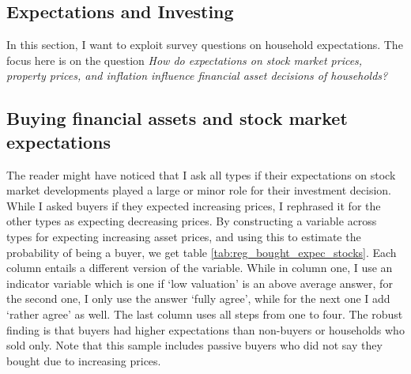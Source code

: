 \documentclass[ProjectABM]{subfiles}
\begin{document}
\subsection{Expectations and Investing} \label{sec:results_exp}
In this section, I want to exploit survey questions on household expectations. The focus here is on the question \textit{How do expectations on stock market prices, property prices, and inflation influence financial asset decisions of households?} 

\subsection{Buying financial assets and stock market expectations}
The reader might have noticed that I ask all types if their expectations on stock market developments played a large or minor role for their investment decision. While I asked buyers if they expected increasing prices, I rephrased it for the other types as expecting decreasing prices. By constructing a variable across types for expecting increasing asset prices, and using this to estimate the probability of being a buyer, we get table \ref{tab:reg_bought_expec_stocks}. Each column entails a different version of the variable. While in column one, I use an indicator variable which is one if `low valuation' is an above average answer, for the second one, I only use the answer `fully agree', while for the next one I add `rather agree' as well. The last column uses all steps from one to four. The robust finding is that buyers had higher expectations than non-buyers or households who sold only. Note that this sample includes passive buyers who did not say they bought due to increasing prices.





\end{document}
